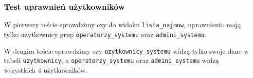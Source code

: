 \subsubsection{Test uprawnień użytkowników}

W pierwszy teście sprawdzimy czy do widoku \texttt{lista\_najmow}, uprawnienia mają tylko użytkownicy grup \texttt{operatorzy\_systemu} oraz \texttt{admini\_systemu}.





W drugim teście sprawdzimy czy \texttt{uzytkownicy\_systemu} widzą tylko swoje dane w tabeli \texttt{uzytkownicy}, a \texttt{operatorzy\_systemu} oraz \texttt{admini\_systemu} widzą wszystkich 4 użytkowników.



